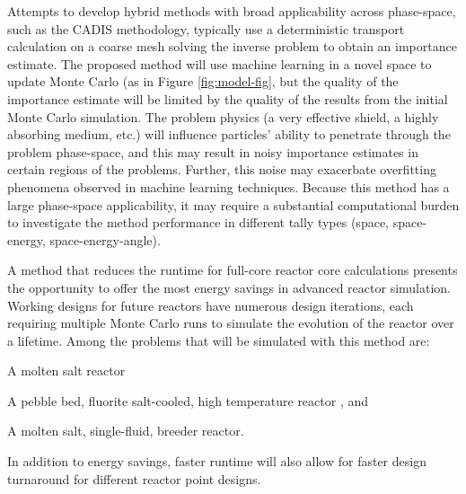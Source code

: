 \documentclass[letterpaper,12pt]{article}
\begin{document}
Attempts to develop hybrid methods with broad
applicability across phase-space, such as the CADIS
methodology\cite{haghighat_monte_2003}, typically
use a deterministic transport calculation on a coarse mesh solving the inverse problem to obtain an importance
estimate\cite{zhang_global_2014, zhang_adjoint-based_2011, haghighat_monte_2003,
hendricks_mcnp_1985}. The proposed method will use machine learning in a novel space to
update Monte Carlo (as in Figure \ref{fig:model-fig}, but the quality of the 
importance estimate will be limited
by the quality of the results from the initial Monte Carlo simulation. The
problem physics (a very effective shield, a highly absorbing medium, etc.) will
influence particles' ability to penetrate through the problem phase-space, and
this may result in noisy importance estimates in certain regions of the
problems\cite{van_wijk_easy_2011}. Further, this noise may exacerbate overfitting phenomena observed in
machine learning techniques. Because this method has a large phase-space
applicability, it may require a substantial computational burden to investigate
the method performance in different tally types (space, space-energy,
space-energy-angle).




A method that reduces the runtime for full-core reactor core calculations
presents the opportunity to offer the most energy savings in advanced reactor
simulation. Working designs for future reactors have numerous design iterations,
each requiring multiple Monte Carlo runs to simulate the evolution of the
reactor over a lifetime. Among the problems that will be
simulated with this method are:
\begin{compactitem}
  \item A molten salt reactor \cite{robertson_msre_1965}
  \item A pebble bed, fluorite salt-cooled, high temperature
    reactor \cite{andreades_design_2016}, and
  \item A molten salt, single-fluid, breeder
    reactor\cite{robertson_conceptual_1971}.
\end{compactitem}
In addition to energy savings, faster runtime will also allow for faster design
turnaround for different reactor point designs.
\end{document}
